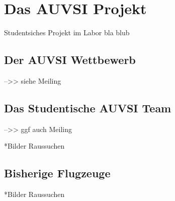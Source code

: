 \chapter{Das AUVSI Projekt}\label{cha:Das AUVSI Projekt}

Studentsiches Projekt im Labor  bla blub

\section{Der AUVSI Wettbewerb}

-->> siehe Meiling 

\section{Das Studentische AUVSI Team}

-->> ggf auch Meiling

*Bilder Raussuchen

\section{Bisherige Flugzeuge}

*Bilder Raussuchen

\begin{comment}
\begin{figure}[H]
\centering
\texttt{[image: Flugzeug\_Bild]} 
\caption{Flugzeug Saison blub-foo} 
\label{fig:Pruefstand}
\end{figure}
\end{comment}
